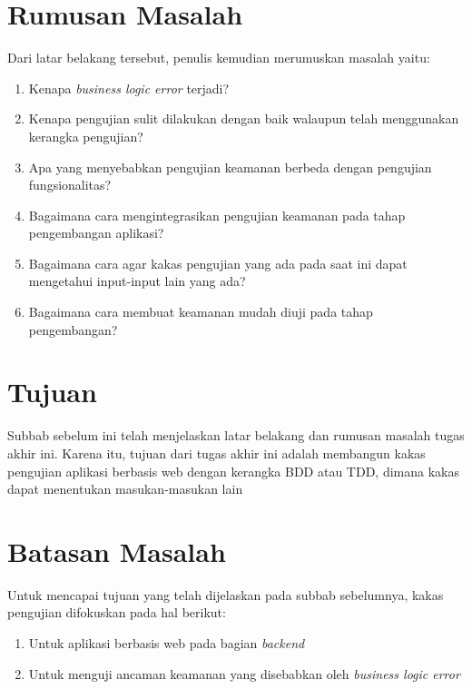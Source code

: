 \section{Rumusan Masalah}

Dari latar belakang tersebut, penulis kemudian merumuskan masalah yaitu:

\begin{enumerate}
    \item Kenapa \textit{business logic error} terjadi?
    \item Kenapa pengujian sulit dilakukan dengan baik walaupun telah menggunakan kerangka pengujian?
    \item Apa yang menyebabkan pengujian keamanan berbeda dengan pengujian fungsionalitas?
    \item Bagaimana cara mengintegrasikan pengujian keamanan pada tahap pengembangan aplikasi?
    \item Bagaimana cara agar kakas pengujian yang ada pada saat ini dapat mengetahui input-input lain yang ada?
    \item Bagaimana cara membuat keamanan mudah diuji pada tahap pengembangan?%
\end{enumerate}

\section{Tujuan}

Subbab sebelum ini telah menjelaskan latar belakang dan rumusan masalah tugas akhir ini.
Karena itu, tujuan dari tugas akhir ini adalah membangun kakas pengujian aplikasi berbasis web
dengan kerangka BDD atau TDD, dimana kakas dapat menentukan masukan-masukan lain 

\section{Batasan Masalah}

Untuk mencapai tujuan yang telah dijelaskan pada subbab sebelumnya, kakas pengujian difokuskan pada hal berikut:

\begin{enumerate}
    \item Untuk aplikasi berbasis web pada bagian \textit{backend}
    \item Untuk menguji ancaman keamanan yang disebabkan oleh \textit{business logic error}
\end{enumerate}

